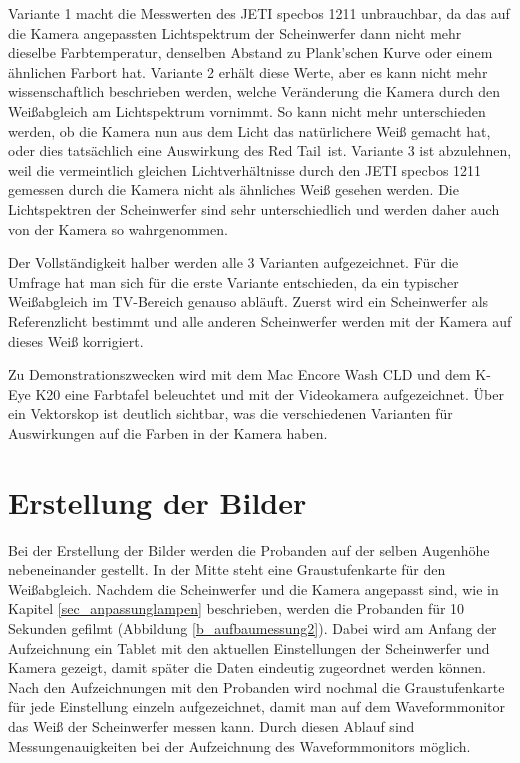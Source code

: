 Variante 1 macht die Messwerten des JETI specbos 1211 unbrauchbar, da das auf die Kamera angepassten Lichtspektrum der Scheinwerfer dann nicht mehr dieselbe Farbtemperatur, denselben Abstand zu Plank'schen Kurve oder einem ähnlichen Farbort hat. Variante 2 erhält diese Werte, aber es kann nicht mehr wissenschaftlich beschrieben werden, welche Veränderung die Kamera durch den Weißabgleich am Lichtspektrum vornimmt. So kann nicht mehr unterschieden werden, ob die Kamera nun aus dem Licht das natürlichere Weiß gemacht hat, oder dies tatsächlich eine Auswirkung des \glqq Red Tail\grqq\ ist.
Variante 3 ist abzulehnen, weil die vermeintlich gleichen Lichtverhältnisse durch den JETI specbos 1211 gemessen durch die Kamera nicht als ähnliches Weiß gesehen werden. Die Lichtspektren der Scheinwerfer sind sehr unterschiedlich und werden daher auch von der Kamera so wahrgenommen.

Der Vollständigkeit halber werden alle 3 Varianten aufgezeichnet. Für die Umfrage hat man sich für die erste Variante entschieden, da ein typischer Weißabgleich im TV-Bereich genauso abläuft. Zuerst wird ein Scheinwerfer als Referenzlicht bestimmt und alle anderen Scheinwerfer werden mit der Kamera auf dieses Weiß korrigiert. 

Zu Demonstrationszwecken wird mit dem Mac Encore Wash CLD und dem K-Eye K20 eine Farbtafel beleuchtet und mit der Videokamera aufgezeichnet. Über ein Vektorskop ist deutlich sichtbar, was die verschiedenen Varianten für Auswirkungen auf die Farben in der Kamera haben. 

\section{Erstellung der Bilder}
\label{sec_erstellungbilder}
Bei der Erstellung der Bilder werden die Probanden auf der selben Augenhöhe nebeneinander gestellt. In der Mitte steht eine Graustufenkarte für den Weißabgleich. Nachdem die Scheinwerfer und die Kamera angepasst sind, wie in Kapitel \ref{sec_anpassunglampen} beschrieben, werden die Probanden für 10 Sekunden gefilmt (Abbildung \ref{b_aufbaumessung2}). Dabei wird am Anfang der Aufzeichnung ein Tablet mit den aktuellen Einstellungen der Scheinwerfer und Kamera gezeigt, damit später die Daten eindeutig zugeordnet werden können.\\
Nach den Aufzeichnungen mit den Probanden wird nochmal die Graustufenkarte für jede Einstellung einzeln aufgezeichnet, damit man auf dem Waveformmonitor das Weiß der Scheinwerfer messen kann. Durch diesen Ablauf sind Messungenauigkeiten bei der Aufzeichnung des Waveformmonitors möglich. 

